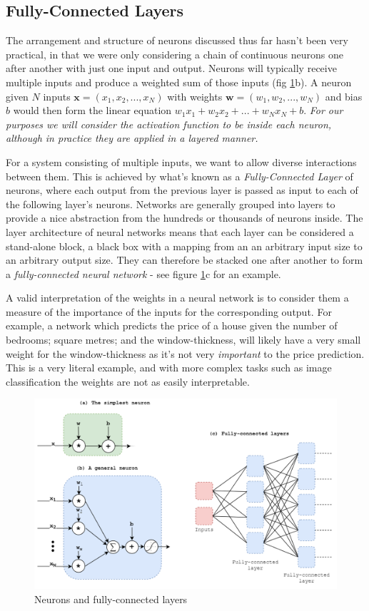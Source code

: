 \documentclass{report}
\begin{document}
\subsection{Fully-Connected Layers} \label{fully-connected:1}
The arrangement and structure of neurons discussed thus far hasn't been very practical, in that we were only considering a chain of continuous neurons one after another with just one input and output. Neurons will typically receive multiple inputs and produce a weighted sum of those inputs (fig \ref{fig:neurons:1}b). A neuron given $N$ inputs $\bm{x} = (x_1, x_2, ..., x_N)$ with weights $\bm{w} = (w_1, w_2, ..., w_N)$ and bias $b$ would then form the linear equation $w_1x_1 + w_2x_2 + ... + w_Nx_N + b$. \textit{For our purposes we will consider the activation function to be inside each neuron, although in practice they are applied in a layered manner.} \par
For a system consisting of multiple inputs, we want to allow diverse interactions between them. This is achieved by what's known as a \textit{Fully-Connected Layer} of neurons, where each output from the previous layer is passed as input to each of the following layer's neurons. Networks are generally grouped into layers to provide a nice abstraction from the hundreds or thousands of neurons inside. The layer architecture of neural networks means that each layer can be considered a stand-alone block, a black box with a mapping from an an arbitrary input size to an arbitrary output size. They can therefore be stacked one after another to form a \textit{fully-connected neural network} - see figure \ref{fig:neurons:1}c for an example. \par
A valid interpretation of the weights in a neural network is to consider them a measure of the importance of the inputs for the corresponding output. For example, a network which predicts the price of a house given the number of bedrooms; square metres; and the window-thickness, will likely have a very small weight for the window-thickness as it's not very \textit{important} to the price prediction. This is a very literal example, and with more complex tasks such as image classification the weights are not as easily interpretable. \par
\begin{figure}[h]
 \centering
 \includegraphics[width=14cm]{neurons}
 \caption{Neurons and fully-connected layers}
 \label{fig:neurons:1}
\end{figure}
\end{document}
